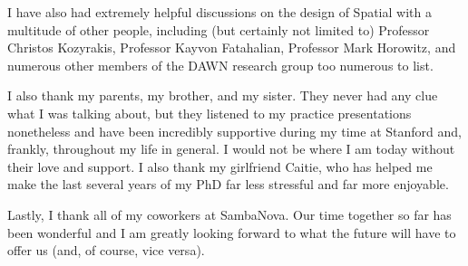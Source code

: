 I have also had extremely helpful discussions on the design of Spatial
with a multitude of other people, including (but certainly not limited to)
Professor Christos Kozyrakis, Professor Kayvon Fatahalian, Professor Mark Horowitz,
and numerous other members of the DAWN research group too numerous to list.

I also thank my parents, my brother, and my sister. They never had any
clue what I was talking about, but they listened to my practice presentations
nonetheless and have been incredibly supportive during my time at Stanford and,
frankly, throughout my life in general. I would not be where I am today without
their love and support. I also thank my girlfriend Caitie, who has helped me
make the last several years of my PhD far less stressful and far more enjoyable.

Lastly, I thank all of my coworkers at SambaNova. Our time
together so far has been wonderful and I am greatly looking forward to what
the future will have to offer us (and, of course, vice versa).
